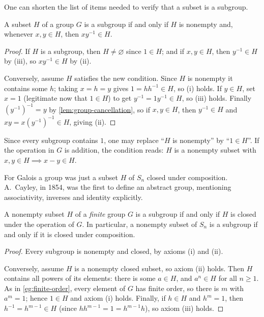 One can shorten the list of items needed to verify that a subset is a subgroup.

\begin{proposition}\label{prop:subgroup-criterion}
	A subset \(H\) of a group \(G\) is a subgroup if and only if \(H\) is nonempty and,
	whenever \(x, y \in H\), then \(xy^{-1} \in H\).
\end{proposition}

\begin{proof}
	If \(H\) is a subgroup, then \(H \neq \varnothing\) since \(1 \in H\); and if
	\(x, y \in H\), then \(y^{-1} \in H\) by (iii), so \(xy^{-1} \in H\) by (ii).

	Conversely, assume \(H\) satisfies the new condition. Since \(H\) is nonempty it
	contains some \(h\); taking \(x = h = y\) gives \(1 = hh^{-1} \in H\), so (i) holds. If
	\(y \in H\), set \(x = 1\) (legitimate now that \(1 \in H\)) to get
	\(y^{-1} = 1y^{-1} \in H\), so (iii) holds. Finally
	\((y^{-1})^{-1} = y\) by \autoref{lem:group-cancellation}, so if \(x, y \in H\), then
	\(y^{-1} \in H\) and \(xy = x(y^{-1})^{-1} \in H\), giving (ii).
\end{proof}

\begin{remark}
	Since every subgroup contains \(1\), one may replace ``\(H\) is nonempty'' by
	``\(1 \in H\)''. If the operation in \(G\) is addition, the condition reads: \(H\) is a
	nonempty subset with \(x, y \in H \implies x - y \in H\).
\end{remark}

\begin{note}[Historical]
	For Galois a group was just a subset \(H\) of \(S_n\) closed under composition.
	A.~Cayley, in 1854, was the first to define an abstract group, mentioning associativity,
	inverses and identity explicitly.
\end{note}

\begin{proposition}\label{prop:finite-subgroup-criterion}
	A nonempty subset \(H\) of a \emph{finite} group \(G\) is a subgroup if and only if
	\(H\) is closed under the operation of \(G\). In particular, a nonempty subset of
	\(S_n\) is a subgroup if and only if it is closed under composition.
\end{proposition}

\begin{proof}
	Every subgroup is nonempty and closed, by axioms (i) and (ii).

	Conversely, assume \(H\) is a nonempty closed subset, so axiom (ii) holds. Then \(H\)
	contains all powers of its elements: there is some \(a \in H\), and \(a^n \in H\) for all
	\(n \geq 1\). As in \autoref{eg:finite-order}, every element of \(G\) has finite
	order, so there is \(m\) with \(a^m = 1\); hence \(1 \in H\) and axiom (i) holds.
	Finally, if \(h \in H\) and \(h^m = 1\), then \(h^{-1} = h^{m-1} \in H\) (since
	\(hh^{m-1} = 1 = h^{m-1}h\)), so axiom (iii) holds.
\end{proof}

